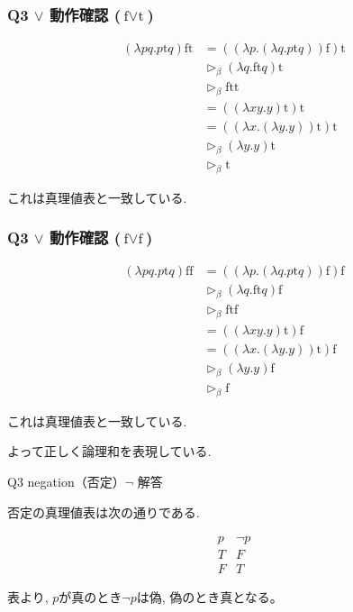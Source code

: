 \begin{frame}[fragile]

\frametitle{Q3 $\lor$ 動作確認 ($\text{f}\lor \text{t}$)}

\begin{align*}
(\lambda pq.p\mathrm{t}q)\mathrm{ft}
&=
((\lambda p.(\lambda q.p\mathrm{t}q))
\mathrm{f})\mathrm{t}
\\
&\triangleright_{\beta}
(\lambda q.\mathrm{ft}q)\mathrm{t}
\\
&\triangleright_{\beta}
\mathrm{ftt}
\\
&=
((\lambda xy.y)\mathrm{t})\mathrm{t}
\\
&=
((\lambda x.(\lambda y.y))
\mathrm{t})\mathrm{t}
\\
&\triangleright_{\beta}
(\lambda y.y)\mathrm{t}
\\
&\triangleright_{\beta}
\mathrm{t}
\end{align*}

これは真理値表と一致している.

\end{frame}

\begin{frame}[fragile]

\frametitle{Q3 $\lor$ 動作確認 ($\text{f}\lor \text{f}$)}

\begin{align*}
(\lambda pq.p\mathrm{t}q)\mathrm{ff}
&=
((\lambda p.(\lambda q.p\mathrm{t}q))
\mathrm{f})\mathrm{f}
\\
&\triangleright_{\beta}
(\lambda q.\mathrm{ft}q)\mathrm{f}
\\
&\triangleright_{\beta}
\mathrm{ftf}
\\
&=
((\lambda xy.y)\mathrm{t})\mathrm{f}
\\
&=
((\lambda x.(\lambda y.y))
\mathrm{t})\mathrm{f}
\\
&\triangleright_{\beta}
(\lambda y.y)\mathrm{f}
\\
&\triangleright_{\beta}
\mathrm{f}
\end{align*}

これは真理値表と一致している.

よって正しく論理和を表現している.
\end{frame}

\begin{frame}{Q3 negation（否定）$\neg$ 解答}

否定の真理値表は次の通りである.

\[
\begin{array}{c|c}
p & \neg p\\
\hline
T & F\\
F & T
\end{array}
\]

表より, $p$が真のとき$\neg p$は偽, 偽のとき真となる。

\end{frame}

